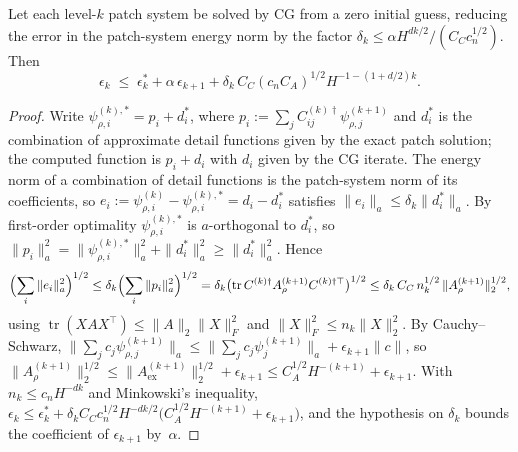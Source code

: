 \documentclass[hidelinks]{siamart}
\theoremstyle{nonumberplain}
\numberwithin{theorem}{section}
\begin{document}
\begin{lemma}\label{lem:patch_cg}
Let each level-$k$ patch system be solved by CG from a zero initial
guess, reducing the error in the patch-system energy norm by the factor
$\delta_k \leq \alpha H^{dk/2}/(C_C c_n^{1/2})$.  Then
\[
  \epsilon_k \;\leq\; \epsilon^\ast_k + \alpha\,\epsilon_{k+1}
    + \delta_k\, C_C (c_n C_A)^{1/2} H^{-1-(1+d/2)k} .
\]
\end{lemma}

\begin{proof}
Write $\psi^{(k),\ast}_{\rho,i} = p_i + d^\ast_i$, where
$p_i := \sum_j C^{(k)\dagger}_{ij} \psi^{(k+1)}_{\rho,j}$ and $d^\ast_i$ is the
combination of approximate detail functions given by the exact patch
solution; the computed function is $p_i + d_i$ with $d_i$ given by the CG
iterate.  The energy norm of a combination of detail functions is the
patch-system norm of its coefficients, so
$e_i := \psi^{(k)}_{\rho,i} - \psi^{(k),\ast}_{\rho,i} = d_i - d^\ast_i$
satisfies $\|e_i\|_a \leq \delta_k \|d^\ast_i\|_a$.  By first-order
optimality $\psi^{(k),\ast}_{\rho,i}$ is $a$-orthogonal to $d^\ast_i$, so
$\|p_i\|_a^2 = \|\psi^{(k),\ast}_{\rho,i}\|_a^2 + \|d^\ast_i\|_a^2 \geq \|d^\ast_i\|_a^2$.
Hence
\[
  \Bigl(\sum_i \|e_i\|_a^2\Bigr)^{1/2}
  \leq \delta_k \Bigl(\sum_i \|p_i\|_a^2\Bigr)^{1/2}
  = \delta_k \bigl(\operatorname{tr} C^{(k)\dagger} A^{(k+1)}_\rho C^{(k)\dagger\top}\bigr)^{1/2}
  \leq \delta_k\, C_C\, n_k^{1/2}\, \|A^{(k+1)}_\rho\|_2^{1/2},
\]
using $\operatorname{tr}(XAX^\top) \leq \|A\|_2 \|X\|_F^2$ and
$\|X\|_F^2 \leq n_k \|X\|_2^2$.  By Cauchy--Schwarz,
$\|\sum_j c_j \psi^{(k+1)}_{\rho,j}\|_a \leq
 \|\sum_j c_j \psi^{(k+1)}_j\|_a + \epsilon_{k+1} \|c\|$, so
$\|A^{(k+1)}_\rho\|_2^{1/2} \leq \|A^{(k+1)}_{\mathrm{ex}}\|_2^{1/2} + \epsilon_{k+1}
 \leq C_A^{1/2} H^{-(k+1)} + \epsilon_{k+1}$.  With
$n_k \leq c_n H^{-dk}$ and Minkowski's inequality,
$\epsilon_k \leq \epsilon^\ast_k + \delta_k C_C c_n^{1/2} H^{-dk/2}
 \bigl(C_A^{1/2} H^{-(k+1)} + \epsilon_{k+1}\bigr)$, and the hypothesis on
$\delta_k$ bounds the coefficient of $\epsilon_{k+1}$ by~$\alpha$.
\end{proof}
\end{document}
